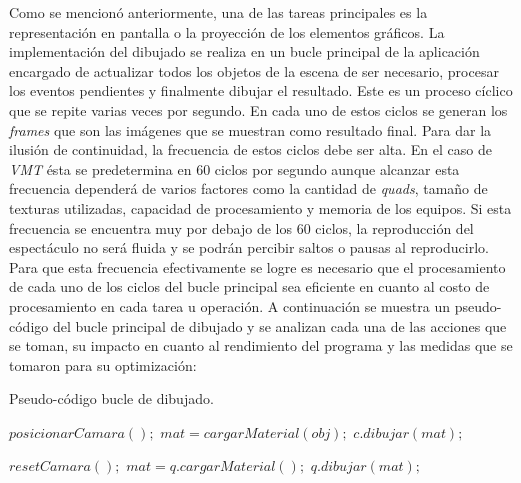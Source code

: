 Como se mencionó anteriormente, una de las tareas principales es la representación en pantalla o la proyección de los elementos gráficos. La implementación del dibujado se realiza en un bucle principal de la aplicación encargado de actualizar todos los objetos de la escena de ser necesario, procesar los eventos pendientes y finalmente dibujar el resultado. Este es un proceso cíclico que se repite varias veces por segundo.
En cada uno de estos ciclos se generan los \emph{frames} que son las imágenes que se muestran como resultado final.
Para dar la ilusión de continuidad, la frecuencia de estos ciclos debe ser alta. En el caso de \emph{VMT} ésta se predetermina en 60 ciclos por segundo aunque alcanzar esta frecuencia dependerá de varios factores como la cantidad de \emph{quads}, tamaño de texturas utilizadas, capacidad de procesamiento y memoria de los equipos.
Si esta frecuencia se encuentra muy por debajo de los 60 ciclos, la reproducción del espectáculo no será fluida y se podrán percibir saltos o pausas al reproducirlo.
Para que esta frecuencia efectivamente se logre es necesario que el procesamiento de cada uno de los ciclos del bucle principal sea eficiente en cuanto al costo de procesamiento en cada tarea u operación. A continuación se muestra un pseudo-código del bucle principal de dibujado y se analizan cada una de las acciones que se toman, su impacto en cuanto al rendimiento del programa y las medidas que se tomaron para su optimización:

\begin{algorithm}
    \caption{Pseudo-código bucle de dibujado.}
    \label{alg:mainLoop}
    \begin{algorithmic}
      \State $posicionarCamara();$
             \State $mat = cargarMaterial(obj);$
             \State $c.dibujar(mat);$
         \EndFor
      \EndFor

      \State $resetCamara();$
         \State $mat = q.cargarMaterial();$
         \State $q.dibujar(mat);$
      \EndFor
    \end{algorithmic}
\end{algorithm}


